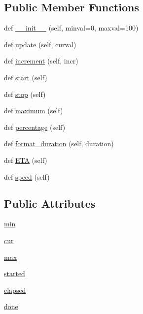 \subsection*{Public Member Functions}
\begin{DoxyCompactItemize}
\item 
def \hyperlink{classpip_1_1__vendor_1_1distlib_1_1util_1_1Progress_afa8ad13140495902bb448a511928176a}{\+\_\+\+\_\+init\+\_\+\+\_\+} (self, minval=0, maxval=100)
\item 
def \hyperlink{classpip_1_1__vendor_1_1distlib_1_1util_1_1Progress_a0e2c7e6e0640762949d9493550a192e8}{update} (self, curval)
\item 
def \hyperlink{classpip_1_1__vendor_1_1distlib_1_1util_1_1Progress_a32ab66122aabe4fc821ac7d8e9914242}{increment} (self, incr)
\item 
def \hyperlink{classpip_1_1__vendor_1_1distlib_1_1util_1_1Progress_aa0a8df6cd2b5d2c8ce7f18016fe1ed32}{start} (self)
\item 
def \hyperlink{classpip_1_1__vendor_1_1distlib_1_1util_1_1Progress_a2758af67e089f3caaf3ff8c713e53c11}{stop} (self)
\item 
def \hyperlink{classpip_1_1__vendor_1_1distlib_1_1util_1_1Progress_af5390ed401471ddbca495b06488f022b}{maximum} (self)
\item 
def \hyperlink{classpip_1_1__vendor_1_1distlib_1_1util_1_1Progress_aafdb19ed9e5f539a8bf7d98166d8fa28}{percentage} (self)
\item 
def \hyperlink{classpip_1_1__vendor_1_1distlib_1_1util_1_1Progress_a83d1de00ab6c5497fdceb2025a35e1b4}{format\+\_\+duration} (self, duration)
\item 
def \hyperlink{classpip_1_1__vendor_1_1distlib_1_1util_1_1Progress_a8726158a289902822972ab23ec281ba9}{E\+TA} (self)
\item 
def \hyperlink{classpip_1_1__vendor_1_1distlib_1_1util_1_1Progress_a62f3e6b10e5507f9784d70f021045bbc}{speed} (self)
\end{DoxyCompactItemize}
\subsection*{Public Attributes}
\begin{DoxyCompactItemize}
\item 
\hyperlink{classpip_1_1__vendor_1_1distlib_1_1util_1_1Progress_a9149bad412b5f70dfb1673b00c2895bc}{min}
\item 
\hyperlink{classpip_1_1__vendor_1_1distlib_1_1util_1_1Progress_a066d938be4337938b671c4650d974f84}{cur}
\item 
\hyperlink{classpip_1_1__vendor_1_1distlib_1_1util_1_1Progress_a41cd50648add26780a2661e44974bf8b}{max}
\item 
\hyperlink{classpip_1_1__vendor_1_1distlib_1_1util_1_1Progress_aff736c0a1286da10d077f815d3b0f4a5}{started}
\item 
\hyperlink{classpip_1_1__vendor_1_1distlib_1_1util_1_1Progress_ae565234be087c3c013d23a4b32f119b9}{elapsed}
\item 
\hyperlink{classpip_1_1__vendor_1_1distlib_1_1util_1_1Progress_a8cf9ad813dca16f33a0ea5169a686b04}{done}
\end{DoxyCompactItemize}
